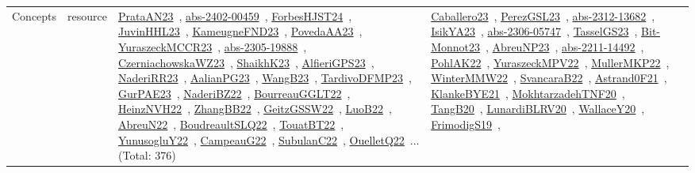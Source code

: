 {\begin{longtable}{lp{3cm}>{\raggedright\arraybackslash}p{6cm}>{\raggedright\arraybackslash}p{6cm}>{\raggedright\arraybackslash}p{8cm}}
Concepts & resource & \href{works/PrataAN23.pdf}{PrataAN23}~\cite{PrataAN23}, \href{works/abs-2402-00459.pdf}{abs-2402-00459}~\cite{abs-2402-00459}, \href{works/ForbesHJST24.pdf}{ForbesHJST24}~\cite{ForbesHJST24}, \href{works/JuvinHHL23.pdf}{JuvinHHL23}~\cite{JuvinHHL23}, \href{works/KameugneFND23.pdf}{KameugneFND23}~\cite{KameugneFND23}, \href{works/PovedaAA23.pdf}{PovedaAA23}~\cite{PovedaAA23}, \href{works/YuraszeckMCCR23.pdf}{YuraszeckMCCR23}~\cite{YuraszeckMCCR23}, \href{works/abs-2305-19888.pdf}{abs-2305-19888}~\cite{abs-2305-19888}, \href{works/CzerniachowskaWZ23.pdf}{CzerniachowskaWZ23}~\cite{CzerniachowskaWZ23}, \href{works/ShaikhK23.pdf}{ShaikhK23}~\cite{ShaikhK23}, \href{works/AlfieriGPS23.pdf}{AlfieriGPS23}~\cite{AlfieriGPS23}, \href{works/NaderiRR23.pdf}{NaderiRR23}~\cite{NaderiRR23}, \href{works/AalianPG23.pdf}{AalianPG23}~\cite{AalianPG23}, \href{works/WangB23.pdf}{WangB23}~\cite{WangB23}, \href{works/TardivoDFMP23.pdf}{TardivoDFMP23}~\cite{TardivoDFMP23}, \href{works/GurPAE23.pdf}{GurPAE23}~\cite{GurPAE23}, \href{works/NaderiBZ22.pdf}{NaderiBZ22}~\cite{NaderiBZ22}, \href{works/BourreauGGLT22.pdf}{BourreauGGLT22}~\cite{BourreauGGLT22}, \href{works/HeinzNVH22.pdf}{HeinzNVH22}~\cite{HeinzNVH22}, \href{works/ZhangBB22.pdf}{ZhangBB22}~\cite{ZhangBB22}, \href{works/GeitzGSSW22.pdf}{GeitzGSSW22}~\cite{GeitzGSSW22}, \href{works/LuoB22.pdf}{LuoB22}~\cite{LuoB22}, \href{works/AbreuN22.pdf}{AbreuN22}~\cite{AbreuN22}, \href{works/BoudreaultSLQ22.pdf}{BoudreaultSLQ22}~\cite{BoudreaultSLQ22}, \href{works/TouatBT22.pdf}{TouatBT22}~\cite{TouatBT22}, \href{works/YunusogluY22.pdf}{YunusogluY22}~\cite{YunusogluY22}, \href{works/CampeauG22.pdf}{CampeauG22}~\cite{CampeauG22}, \href{works/SubulanC22.pdf}{SubulanC22}~\cite{SubulanC22}, \href{works/OuelletQ22.pdf}{OuelletQ22}~\cite{OuelletQ22}... (Total: 376) & \href{works/Caballero23.pdf}{Caballero23}~\cite{Caballero23}, \href{works/PerezGSL23.pdf}{PerezGSL23}~\cite{PerezGSL23}, \href{works/abs-2312-13682.pdf}{abs-2312-13682}~\cite{abs-2312-13682}, \href{works/IsikYA23.pdf}{IsikYA23}~\cite{IsikYA23}, \href{works/abs-2306-05747.pdf}{abs-2306-05747}~\cite{abs-2306-05747}, \href{works/TasselGS23.pdf}{TasselGS23}~\cite{TasselGS23}, \href{works/Bit-Monnot23.pdf}{Bit-Monnot23}~\cite{Bit-Monnot23}, \href{works/AbreuNP23.pdf}{AbreuNP23}~\cite{AbreuNP23}, \href{works/abs-2211-14492.pdf}{abs-2211-14492}~\cite{abs-2211-14492}, \href{works/PohlAK22.pdf}{PohlAK22}~\cite{PohlAK22}, \href{works/YuraszeckMPV22.pdf}{YuraszeckMPV22}~\cite{YuraszeckMPV22}, \href{works/MullerMKP22.pdf}{MullerMKP22}~\cite{MullerMKP22}, \href{works/WinterMMW22.pdf}{WinterMMW22}~\cite{WinterMMW22}, \href{works/SvancaraB22.pdf}{SvancaraB22}~\cite{SvancaraB22}, \href{works/Astrand0F21.pdf}{Astrand0F21}~\cite{Astrand0F21}, \href{works/KlankeBYE21.pdf}{KlankeBYE21}~\cite{KlankeBYE21}, \href{works/MokhtarzadehTNF20.pdf}{MokhtarzadehTNF20}~\cite{MokhtarzadehTNF20}, \href{works/TangB20.pdf}{TangB20}~\cite{TangB20}, \href{works/LunardiBLRV20.pdf}{LunardiBLRV20}~\cite{LunardiBLRV20}, \href{works/WallaceY20.pdf}{WallaceY20}~\cite{WallaceY20}, \href{works/FrimodigS19.pdf}{FrimodigS19}~\cite{FrimodigS19}, 
\end{longtable}}
